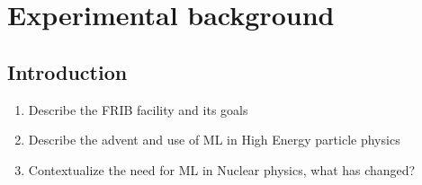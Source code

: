 \chapter{Experimental background}\label{ch:experimental}

\section{Introduction}

\begin{enumerate}
	\item Describe the FRIB facility and its goals 
	\item Describe the advent and use of ML in High Energy particle physics
	\item Contextualize the need for ML in Nuclear physics, what has changed? 
\end{enumerate}